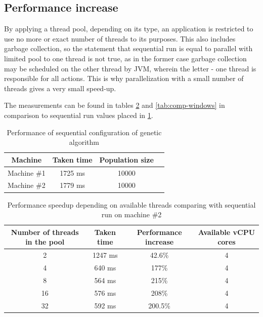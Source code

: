 \subsection{Performance increase}

By applying a thread pool, depending on its type, an application is restricted to use no more or exact number of threads to its purposes. This also includes garbage collection, so the statement that sequential run is equal to parallel with limited pool to one thread is not true, as in the former case garbage collection may be scheduled on the other thread by JVM, wherein the letter - one thread is responsible for all actions. This is why parallelization with a small number of threads gives a very small speed-up.

The measurements can be found in tables \ref{tab:comp-ubuntu} and \ref{tab:comp-windows} in comparison to sequential run values placed in \ref{tab:win-ub-perf}.

\begin{table}[h]
\centering\caption{Performance of sequential configuration of genetic algorithm \label{tab:win-ub-perf}}
\begin{tabular}{|c|c|c|c|}
\hline
\textbf{Machine} & \textbf{Taken time} & \textbf{Population size} \\
\hline
Machine \#1 & 1725 ms & 10000 \\
\hline
Machine \#2 & 1779 ms & 10000 \\
\hline
\end{tabular}
\end{table}

\begin{table}[h]
\centering\caption{Performance speedup depending on available threads comparing with sequential run on machine \#2 \label{tab:comp-ubuntu}}
\begin{tabular}{|c|c|c|c|}
\hline
\textbf{Number of threads in the pool} & \textbf{Taken time} & \textbf{Performance increase} & Available vCPU cores \\
\hline
 2 & 1247 ms & 42.6\% & 4 \\
\hline
 4 & 640 ms & 177\% & 4 \\
\hline
 8 & 564 ms & 215\% & 4 \\
\hline
 16 & 576 ms & 208\% & 4 \\
\hline
 32 & 592 ms & 200.5\% & 4 \\
\hline
\end{tabular}
\end{table}

